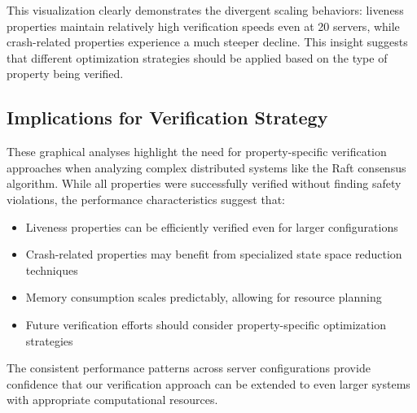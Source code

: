 This visualization clearly demonstrates the divergent scaling behaviors: liveness properties maintain relatively high verification speeds even at 20 servers, while crash-related properties experience a much steeper decline. This insight suggests that different optimization strategies should be applied based on the type of property being verified.

\subsection{Implications for Verification Strategy}

These graphical analyses highlight the need for property-specific verification approaches when analyzing complex distributed systems like the Raft consensus algorithm. While all properties were successfully verified without finding safety violations, the performance characteristics suggest that:

\begin{itemize}
    \item Liveness properties can be efficiently verified even for larger configurations
    \item Crash-related properties may benefit from specialized state space reduction techniques
    \item Memory consumption scales predictably, allowing for resource planning
    \item Future verification efforts should consider property-specific optimization strategies
\end{itemize}

The consistent performance patterns across server configurations provide confidence that our verification approach can be extended to even larger systems with appropriate computational resources. 